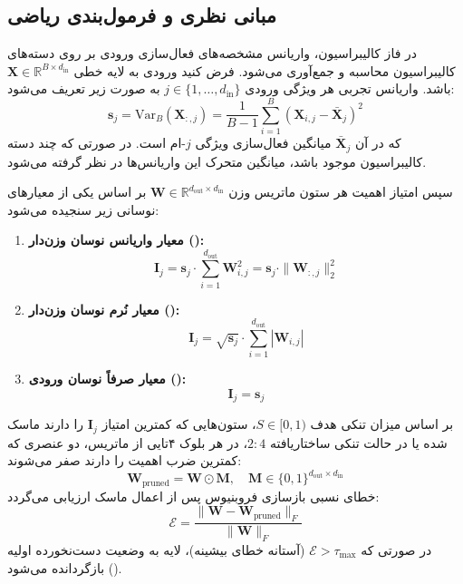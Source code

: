 \subsection{مبانی نظری و فرمول‌بندی ریاضی}
در فاز کالیبراسیون، واریانس مشخصه‌های فعال‌سازی ورودی بر روی دسته‌های کالیبراسیون محاسبه و جمع‌آوری می‌شود. فرض کنید ورودی به لایه خطی $\mathbf{X} \in \mathbb{R}^{B \times d_{\text{in}}}$ باشد. واریانس تجربی هر ویژگی ورودی $j \in \{1, \dots, d_{\text{in}}\}$ به صورت زیر تعریف می‌شود:
\begin{equation}
\mathbf{s}_j = \text{Var}_B(\mathbf{X}_{:, j}) = \frac{1}{B - 1} \sum_{i=1}^B (\mathbf{X}_{i, j} - \bar{\mathbf{X}}_j)^2
\end{equation}
که در آن $\bar{\mathbf{X}}_j$ میانگین فعال‌سازی ویژگی $j$-ام است. در صورتی که چند دسته کالیبراسیون موجود باشد، میانگین متحرک این واریانس‌ها در نظر گرفته می‌شود.

سپس امتیاز اهمیت هر ستون ماتریس وزن $\mathbf{W} \in \mathbb{R}^{d_{\text{out}} \times d_{\text{in}}}$ بر اساس یکی از معیارهای نوسانی زیر سنجیده می‌شود:
\begin{enumerate}
    \item \textbf{معیار واریانس نوسان وزن‌دار ():}
    \begin{equation}
    \mathbf{I}_j = \mathbf{s}_j \cdot \sum_{i=1}^{d_{\text{out}}} \mathbf{W}_{i, j}^2 = \mathbf{s}_j \cdot \|\mathbf{W}_{:, j}\|_2^2
    \end{equation}
    \item \textbf{معیار نُرم نوسان وزن‌دار ():}
    \begin{equation}
    \mathbf{I}_j = \sqrt{\mathbf{s}_j} \cdot \sum_{i=1}^{d_{\text{out}}} |\mathbf{W}_{i, j}|
    \end{equation}
    \item \textbf{معیار صرفاً نوسان ورودی ():}
    \begin{equation}
    \mathbf{I}_j = \mathbf{s}_j
    \end{equation}
\end{enumerate}

بر اساس میزان تنکی هدف $S \in [0, 1)$، ستون‌هایی که کمترین امتیاز $\mathbf{I}_j$ را دارند ماسک شده یا در حالت تنکی ساختاریافته $2:4$، در هر بلوک ۴تایی از ماتریس، دو عنصری که کمترین ضرب اهمیت را دارند صفر می‌شوند:
\begin{equation}
\mathbf{W}_{\text{pruned}} = \mathbf{W} \odot \mathbf{M}, \quad \mathbf{M} \in \{0, 1\}^{d_{\text{out}} \times d_{\text{in}}}
\end{equation}
خطای نسبی بازسازی فروبنیوس پس از اعمال ماسک ارزیابی می‌گردد:
\begin{equation}
\mathcal{E} = \frac{\|\mathbf{W} - \mathbf{W}_{\text{pruned}}\|_F}{\|\mathbf{W}\|_F}
\end{equation}
در صورتی که $\mathcal{E} > \tau_{\text{max}}$ (آستانه خطای بیشینه)، لایه به وضعیت دست‌نخورده اولیه بازگردانده می‌شود ().

